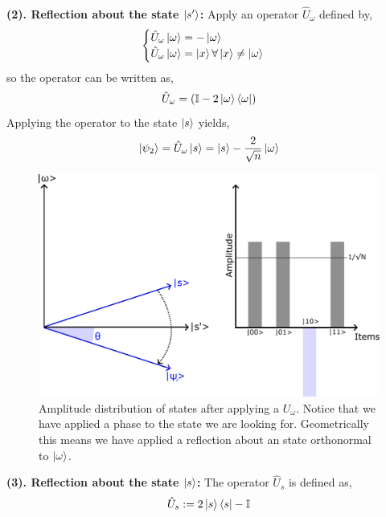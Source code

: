 \\
\textbf{(2). Reflection about the state $\ket{s'}$:} Apply an operator $\hat{U}_{\omega}$ defined by,
\begin{equation}
     \begin{cases}
       \hat{U}_{\omega}\ket{\omega} = -\ket{\omega} \\
       \hat{U}_{\omega}\ket{\omega} = \ket{x}  \forall \ket{x}\neq \ket{\omega} \\
     \end{cases}
\end{equation}
so the operator can be written as,
\begin{equation}
    \hat{U}_{\omega} = \left(\mathbb{I} - 2\ket{\omega}\bra{\omega}\right)
\end{equation}
Applying the operator to the state $\ket{s}$ yields,
\begin{equation}
    \ket{\psi_{2}} = \hat{U}_{\omega}\ket{s} = \ket{s} -\frac{2}{\sqrt{n}}\ket{\omega}
\end{equation}
\begin{figure}[H]
    \centering
    \includegraphics[scale=0.55]{Figures/Grover_Step2.pdf}
    \caption{Amplitude distribution of states after applying a $U_{\omega}$. Notice that we have applied a phase to the state we are looking for. Geometrically this means we have applied a reflection about an state orthonormal to $\ket\omega$.}
    \label{fig:Grover_step2}
\end{figure}
\textbf{(3). Reflection about the state $\ket{s}$:} The operator $\hat{U}_{s}$ is defined as,
\begin{equation}
    \hat{U}_{s} := 2\ket{s}\bra{s} - \mathbb{I}
\end{equation}
